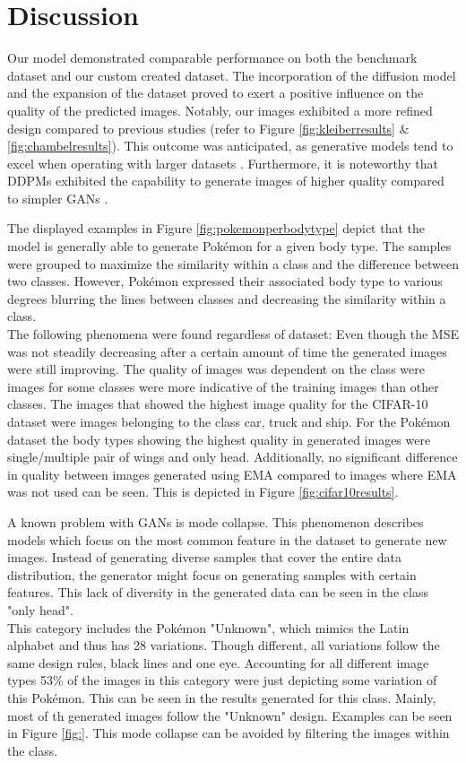 \documentclass[12pt]{article}
\theoremstyle{plain}
\theoremstyle{definition}
\theoremstyle{remark}
\begin{document}
\section{Discussion}
\label{sec:discussion}
Our model demonstrated comparable performance on both the benchmark dataset and our custom created dataset. The incorporation of the diffusion model and the expansion of the dataset proved to exert a positive influence on the quality of the predicted images. Notably, our images exhibited a more refined design compared to previous studies (refer to Figure \ref{fig:kleiberresults} \& \ref{fig:chambelresults}). This outcome was anticipated, as generative models tend to excel when operating with larger datasets \citep{Yang2023}. Furthermore, it is noteworthy that \ac{DDPM}s exhibited the capability to generate images of higher quality compared to simpler \ac{GAN}s \citep{Guarnera2023}.

The displayed examples in Figure \ref{fig:pokemonperbodytype} depict that the model is generally able to generate Pokémon for a given body type. The samples were grouped to maximize the similarity within a class and the difference between two classes. However, Pokémon expressed their associated body type to various degrees blurring the lines between classes and decreasing the similarity within a class. \\
The following phenomena were found regardless of dataset: Even though the \ac{MSE} was not steadily decreasing after a certain amount of time the generated images were still improving. The quality of images was dependent on the class were images for some classes were more indicative of the training images than other classes. The images that showed the highest image quality for the \ac{CIFAR-10} dataset were images belonging to the class car, truck and ship. For the Pokémon dataset the body types showing the highest quality in generated images were single/multiple pair of wings and only head. Additionally, no significant difference in quality between images generated using \ac{EMA} compared to images where \ac{EMA} was not used can be seen. This is depicted in Figure \ref{fig:cifar10results}.

A known problem with \ac{GAN}s is mode collapse. This phenomenon describes models which focus on the most common feature in the dataset to generate new images. Instead of generating diverse samples that cover the entire data distribution, the generator might focus on generating samples with certain features. This lack of diversity in the generated data can be seen in the class "only head".\\
This category includes the Pokémon "Unknown", which mimics the Latin alphabet and thus has 28 variations. Though different, all variations follow the same design rules, black lines and one eye. Accounting for all different image types 53\% of the images in this category were just depicting some variation of this Pokémon. This can be seen in the results generated for this class. Mainly, most of th generated images follow the "Unknown" design. Examples can be seen in Figure \ref{fig:}. This mode collapse can be avoided by filtering the images within the class. 
\end{document}
